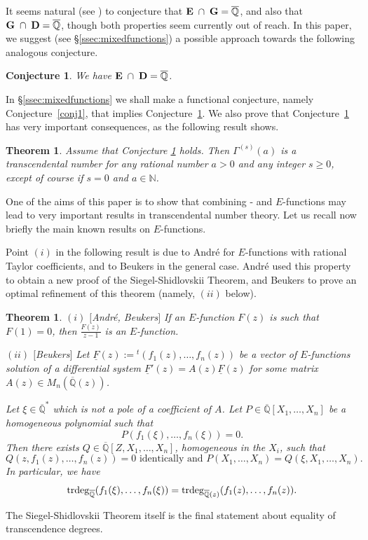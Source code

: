 \documentclass[reqno,12pt]{article}
\numberwithin{equation}{section}
\newtheorem{theo}{Theorem}
\newtheorem{conj}{Conjecture}
\newtheorem{thmx}{Theorem}
\theoremstyle{remark}
\newcommand{\N}{\mathbb{N}}
\newcommand{\Qbar}{\overline{\mathbb Q}}
\newcommand{\etoile}{^*}
\newcommand{\trdeg}{{\rm trdeg}}
\newcommand{\tantie}{{\fontencoding{OT2}\fontfamily{wncyr}\selectfont\CYREREV}}
\newcommand{\antie}{\text{\tantie}}
\newcommand{\EE}{{\bf E}}
\begin{document}


 It seems natural (see \cite[p.~37]{ateo}) to conjecture that $\EE \; \cap \;{\bf G}=\Qbar$, and also that ${\bf G}\;\cap \;{\bf D}=\Qbar$, though both properties seem currently out of reach.  In this paper, we suggest (see \S \ref{ssec:mixedfunctions}) a possible approach towards the following analogous conjecture.

\begin{conj} \label{conj3} We have ${\bf E} \;\cap\;{ \bf D} =\Qbar$.
\end{conj}

In \S \ref{ssec:mixedfunctions} we shall make a functional conjecture, namely Conjecture~\ref{conj1}, that implies  Conjecture~\ref{conj3}. We also prove that  Conjecture~\ref{conj3} has very important  consequences, as the following result shows. 

\begin{theo}\label{prop3} 
 Assume that Conjecture \ref{conj3} holds. Then $\Gamma^{(s)}(a)$  is a transcendental number for any rational number $a>0$ and any integer $s\geq 0$, except of course if $s=0$ and $a\in\N$.
\end{theo} 



One of the aims of this paper is to show that combining \antie- and $E$-functions may lead to very important results in transcendental number theory. Let us recall now briefly the main known results on $E$-functions.



Point $(i)$ in the following result is due to André  \cite{andre2} for $E$-functions with rational Taylor coefficients, and to Beukers  \cite{beukers} in the general case. 
 Andr\'e used this property to obtain a new proof of the Siegel-Shidlovskii Theorem, and Beukers   to prove an optimal refinement of this theorem (namely, $(ii)$  
 below). 
 

\begin{thmx} \label{theoe} 
$(i)$ $[$André, Beukers$]$ If an $E$-function $F(z)$ is such that $F(1)=0$, then $\frac{F(z)}{z-1}$ is an $E$-function.

$(ii)$ $[$Beukers$]$
Let $\underline{F}(z):={}^t(f_1(z), \ldots, f_n(z))$ be a vector of $E$-functions  solution of a differential system $\underline{F}'(z)=A(z)\underline{F}(z)$ for some matrix $A(z)\in M_n(\Qbar(z))$. 

Let $\xi\in\Qbar\etoile$ which is not a pole of a coefficient of $A$. Let $P\in\Qbar[X_1,\ldots,X_n]$ be a homogeneous polynomial such that 
$$P(f_{1}(\xi), \ldots, f_{n}(\xi))=0.$$
Then there exists $Q\in \Qbar[Z,X_1,\ldots,X_n]$, homogeneous in the $X_i$, such that 
$$Q(z, f_1(z), \ldots, f_n(z))=0 \mbox{ identically  and } P(X_1,\ldots,X_n)=Q(\xi, X_1,\ldots,X_n).$$
In particular, we have
$$
\trdeg_{\Qbar}(f_{1}(\xi), \ldots, f_{n}(\xi)) = 
\trdeg_{\Qbar(z)}( f_{1 }(z), \ldots, f_{n}(z)).
$$
\end{thmx}
The Siegel-Shidlovskii Theorem itself is the final statement about equality of transcendence degrees. 
\end{document}

